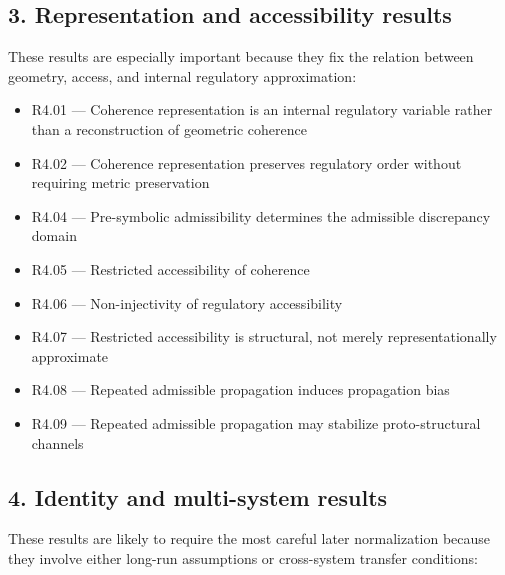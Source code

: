 \documentclass[12pt]{article}
\begin{document}
	\subsection*{3. Representation and accessibility results}
	
	These results are especially important because they fix the relation between geometry, access,
	and internal regulatory approximation:
	
	\begin{itemize}[leftmargin=2em]
		\item R4.01 --- Coherence representation is an internal regulatory variable rather than a reconstruction of geometric coherence
		\item R4.02 --- Coherence representation preserves regulatory order without requiring metric preservation
		\item R4.04 --- Pre-symbolic admissibility determines the admissible discrepancy domain
		\item R4.05 --- Restricted accessibility of coherence
		\item R4.06 --- Non-injectivity of regulatory accessibility
		\item R4.07 --- Restricted accessibility is structural, not merely representationally approximate
		\item R4.08 --- Repeated admissible propagation induces propagation bias
		\item R4.09 --- Repeated admissible propagation may stabilize proto-structural channels
	\end{itemize}
	
	\subsection*{4. Identity and multi-system results}
	
	These results are likely to require the most careful later normalization because they involve
	either long-run assumptions or cross-system transfer conditions:
	
\end{document}
